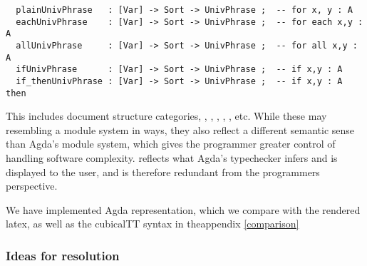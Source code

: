 \begin{verbatim}
  plainUnivPhrase   : [Var] -> Sort -> UnivPhrase ;  -- for x, y : A
  eachUnivPhrase    : [Var] -> Sort -> UnivPhrase ;  -- for each x,y : A
  allUnivPhrase     : [Var] -> Sort -> UnivPhrase ;  -- for all x,y : A
  ifUnivPhrase      : [Var] -> Sort -> UnivPhrase ;  -- if x,y : A
  if_thenUnivPhrase : [Var] -> Sort -> UnivPhrase ;  -- if x,y : A then
\end{verbatim}

This includes document structure categories, , ,
, , , etc. While
these may resembling a module system in ways, they also reflect a different
semantic sense than Agda's module system, which gives the programmer greater
control of handling software complexity.  reflects
what Agda's typechecker infers and is displayed to the user, and is therefore
redundant from the programmers perspective.

We have implemented Agda representation, which we compare with the rendered
latex, as well as the cubicalTT syntax in theappendix \ref{comparison}

\subsubsection{Ideas for resolution}







